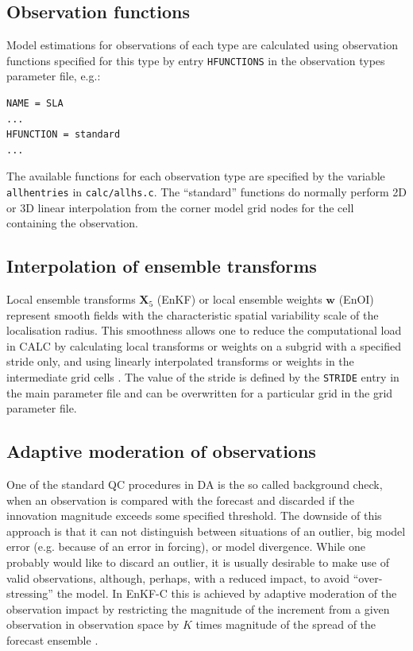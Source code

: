 \documentclass[11pt]{report}
\newcommand{\mb} {\mathbf}
\begin{document}
\subsection{Observation functions}
\label{sec:hfunctions}

Model estimations for observations of each type are calculated using observation functions specified for this type by entry \verb|HFUNCTIONS| in the observation types parameter file, e.g.:
\begin{Verbatim}[frame=single,fontsize=\footnotesize]
NAME = SLA
...
HFUNCTION = standard
...
\end{Verbatim}
The available functions for each observation type are specified by the variable \verb|allhentries| in \verb|calc/allhs.c|.
The ``standard'' functions do normally perform 2D or 3D linear interpolation from the corner model grid nodes for the cell containing the observation.

\subsection{Interpolation of ensemble transforms}

Local ensemble transforms $\mb X_5$ (EnKF) or local ensemble weights $\mb w$ (EnOI) represent smooth fields with the characteristic spatial variability scale of the localisation radius.
This smoothness allows one to reduce the computational load in CALC by calculating local transforms or weights on a subgrid with a specified stride only, and using linearly interpolated transforms or weights in the intermediate grid cells \citep{yan09a}.
The value of the stride is defined by the \verb|STRIDE| entry in the main parameter file and can be overwritten for a particular grid in the grid parameter file.

\subsection{Adaptive moderation of observations}
\label{sec:kfactor}

One of the standard QC procedures in DA is the so called background check, when an observation is compared with the forecast and discarded if the innovation magnitude exceeds some specified threshold.
The downside of this approach is that it can not distinguish between situations of an outlier, big model error (e.g. because of an error in forcing), or model divergence.
While one probably would like to discard an outlier, it is usually desirable to make use of valid observations, although, perhaps, with a reduced impact, to avoid ``over-stressing'' the model.
In EnKF-C this is achieved by adaptive moderation of the observation impact by restricting the magnitude of the increment from a given observation in observation space by $K$ times magnitude of the spread of the forecast ensemble \citep{sak17a}.
\end{document}
